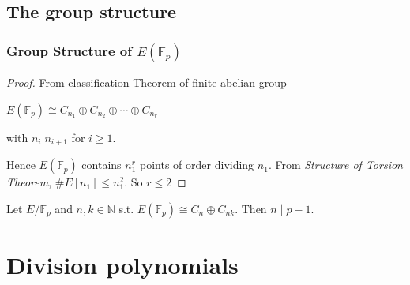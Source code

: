 \documentclass[handout]{beamer}%
\newcommand{\F}{\mathbb F}
\theoremstyle{definition}
\begin{document}
\subsection{The group structure}
\begin{frame}\frametitle{Group Structure of $E(\F_p)$}

\pause

\begin{proof}
From classification Theorem of finite abelian group\\
\centerline{$E(\F_p)\cong  C_{n_1}\oplus C_{n_2}\oplus\cdots\oplus C_{n_r}$}
with $n_i|n_{i+1}$ for $i\ge1$.\pause

Hence $E(\F_p)$ contains $n_1^r$ points of order dividing $n_1$. From
\emph{Structure of Torsion Theorem}, $\#E[n_1]\le n_1^2$.
So $r\le2$\end{proof}\pause

\begin{theorem} Let $E/\F_p$ and $n,k\in\mathbb N$ s.t.
$E(\F_p)\cong C_n\oplus C_{nk}.$
Then $n\mid p-1$.
\end{theorem}%
%
\end{frame}


\section{Division polynomials}
\end{document}
